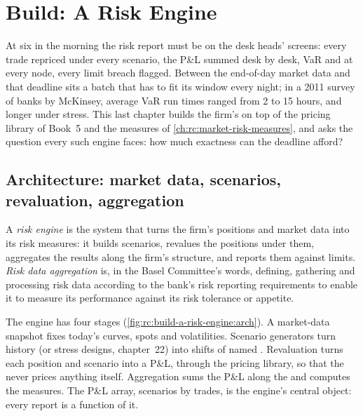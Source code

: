 \chapter{Build: A Risk Engine}\label{ch:rc:build-a-risk-engine}

At six in the morning the risk report must be on the desk heads' screens: every trade repriced under
every scenario, the P\&L summed desk by desk, VaR and  at every node, every limit
breach flagged. Between the end-of-day market data and that deadline sits a batch that has to fit its
window every night; in a 2011 survey of banks by McKinsey, average VaR run times ranged from 2 to 15 hours,
and longer under stress. This last chapter builds the firm's  on top of the pricing library of
Book~5 and the measures of \cref{ch:rc:market-risk-measures}, and asks the question every such engine
faces: how much exactness can the deadline afford?

\section{Architecture: market data, scenarios, revaluation, aggregation}

\begin{definition}\label{def:rc:build-a-risk-engine:engine}
A \emph{risk engine} is the system that turns the firm's positions and market data
into its risk measures: it builds scenarios, revalues the positions under them, aggregates the results
along the firm's structure, and reports them against limits. \emph{Risk data aggregation}
is, in the Basel Committee's words, defining, gathering and processing risk data according to the bank's
risk reporting requirements to enable it to measure its performance against its risk tolerance or appetite.
\end{definition}

The engine has four stages (\cref{fig:rc:build-a-risk-engine:arch}). A market-data snapshot fixes today's
curves, spots and volatilities. Scenario generators turn history (or stress designs, chapter~22) into
shifts of named . Revaluation turns each position and scenario into a P\&L, through the
pricing library, so that the  never prices anything itself. Aggregation sums the P\&L along
the  and computes the measures. The P\&L array, scenarios by trades, is the engine's
central object: every report is a function of it.

